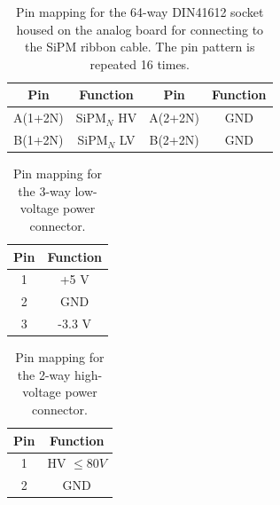 \documentclass[a4paper]{article}
\begin{document}
\begin{table}[h]
    \begin{center}
        \caption{Pin mapping for the 64-way DIN41612 socket housed on the analog board for connecting to the SiPM ribbon cable. The pin pattern is repeated 16 times.}
        \label{tab:IDC64way}
        \begin{tabular}{cc|cc}
            \hline
            \hline
            Pin & Function & Pin & Function \\
            \hline
            A(1+2N) & SiPM$_N$ HV & A(2+2N) & GND \\
            B(1+2N) & SiPM$_N$ LV & B(2+2N) & GND \\
            \hline
            \hline
        \end{tabular}
    \end{center}
\end{table}

\begin{table}[h]
    \begin{center}
        \caption{Pin mapping for the 3-way low-voltage power connector.}
        \label{tab:LVPower}
        \begin{tabular}{cc}
            \hline
            \hline
            Pin & Function \\
            \hline
            1 & +5 V \\
            2 & GND \\
            3 & -3.3 V \\
            \hline
            \hline
        \end{tabular}
    \end{center}
\end{table}

\begin{table}[h]
    \begin{center}
        \caption{Pin mapping for the 2-way high-voltage power connector.}
        \label{tab:HVPower}
        \begin{tabular}{cc}
            \hline
            \hline
            Pin & Function \\
            \hline
            1 & HV $\le 80 V$ \\
            2 & GND \\
            \hline
            \hline
        \end{tabular}
    \end{center}
\end{table}
\end{document}
